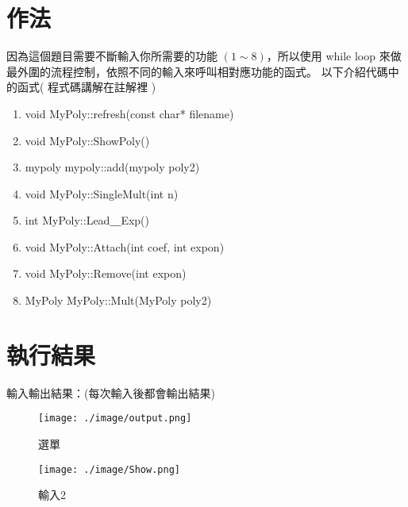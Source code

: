 \documentclass[12pt, a4paper]{article}
\begin{document}
  \section{\fontsize{20pt}{22pt}\selectfont 作法}
  \begin{samepage}
    \fontsize{16pt}{18pt} \selectfont
    因為這個題目需要不斷輸入你所需要的功能 $(1 \sim 8)$，所以使用 while loop 來做最外圍的流程控制，依照不同的輸入來呼叫相對應功能的函式。
    以下介紹代碼中的函式( 程式碼講解在註解裡 )
    \begin{enumerate}
      \item void MyPoly::refresh(const char* filename)
      
      \item void MyPoly::ShowPoly() 
      
      \item mypoly mypoly::add(mypoly poly2)
      
      \item void MyPoly::SingleMult(int n)
      
      \item int MyPoly::Lead＿Exp()
      
      \item void MyPoly::Attach(int coef, int expon)
      
      \item void MyPoly::Remove(int expon)
      
      \item MyPoly MyPoly::Mult(MyPoly poly2)
      
    \end{enumerate}
    \normalfont
  \end{samepage}

  \section{\fontsize{20pt}{22pt}\selectfont 執行結果}
      \fontsize{16pt}{18pt} \selectfont
        輸入輸出結果：(每次輸入後都會輸出結果)
        \begin{figure}[ht]
          \centering
          \texttt{[image: ./image/output.png]}
          \caption{選單}
        \end{figure}

        \begin{figure}
          \centering
          \texttt{[image: ./image/Show.png]}
          \caption{輸入2}
        \end{figure}
\end{document}
